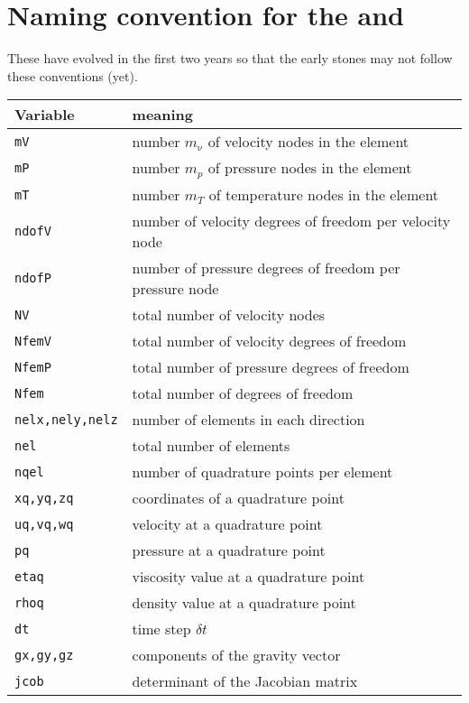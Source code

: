 
\newpage

\newpage %
\section*{
Naming convention for the \stones and \elefant
\label{f00}}

These have evolved in the first two years so that the early stones may not 
follow these conventions (yet).

\begin{tabular}{p{2cm}p{14cm}}
\hline
Variable & meaning \\
\hline
\hline
{\tt mV}    & number $m_\upnu$ of velocity nodes in the element \\
{\tt mP}    & number $m_p$ of pressure nodes in the element \\
{\tt mT}    & number $m_T$ of temperature nodes in the element \\
{\tt ndofV} & number of velocity degrees of freedom per velocity node \\
{\tt ndofP} & number of pressure degrees of freedom per pressure node \\
{\tt NV}    & total number of velocity nodes \\
{\tt NfemV} & total number of velocity degrees of freedom \\
{\tt NfemP} & total number of pressure degrees of freedom \\
{\tt Nfem}  & total number of degrees of freedom \\
{\tt nelx,nely,nelz} & number of elements in each direction \\
{\tt nel}   & total number of elements \\
{\tt nqel}  & number of quadrature points per element \\
{\tt xq,yq,zq} & coordinates of a quadrature point \\
{\tt uq,vq,wq} & velocity at a quadrature point \\
{\tt pq}   & pressure at a quadrature point \\
{\tt etaq} & viscosity value at a quadrature point \\
{\tt rhoq} & density value at a quadrature point \\
{\tt dt}   & time step $\delta t$\\ 
{\tt gx,gy,gz} & components of the gravity vector \\
{\tt jcob} & determinant of the Jacobian matrix \\
\hline
\end{tabular}

